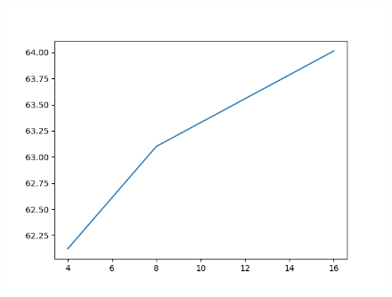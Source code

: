 \documentclass{article}
\theoremstyle{remark}
\newtheorem{defn}{Definition}
\begin{document}
\begin{figure}
\centering
\includegraphics{nvserror.png}
\end{figure}










%

\end{document}
